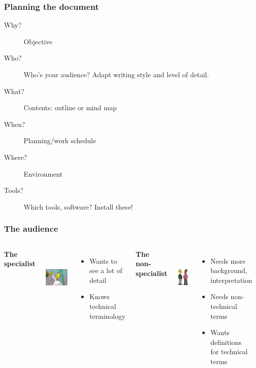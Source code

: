 \documentclass{beamer}
\begin{document}
\begin{frame}
  \frametitle{Planning the document}

  \begin{description}
    \item[Why?] Objective
    \item[Who?] Who's your audience? Adapt writing style and level of detail.
    \item[What?] Contents: outline or mind map
    \item[When?] Planning/work schedule
    \item[Where?] Environment
    \item[Tools?] Which tools, software? Install these!
  \end{description}
\end{frame}

\begin{frame}
  \frametitle{The audience}

  \begin{columns}[c]

    \centering

    \textbf{The specialist}

    \includegraphics[height=3cm]{img/oef2-04.png}

    \begin{itemize}
      \item Wants to see a lot of detail
      \item Knows technical terminology
    \end{itemize}


    \centering

    \textbf{The non-specialist}

    \includegraphics[height=3cm]{img/oef2-05}

    \begin{itemize}
      \item Needs more background, interpretation
      \item Needs non-technical terms
      \item Wants definitions for technical terms
    \end{itemize}
  \end{columns}
\end{frame}
\end{document}
